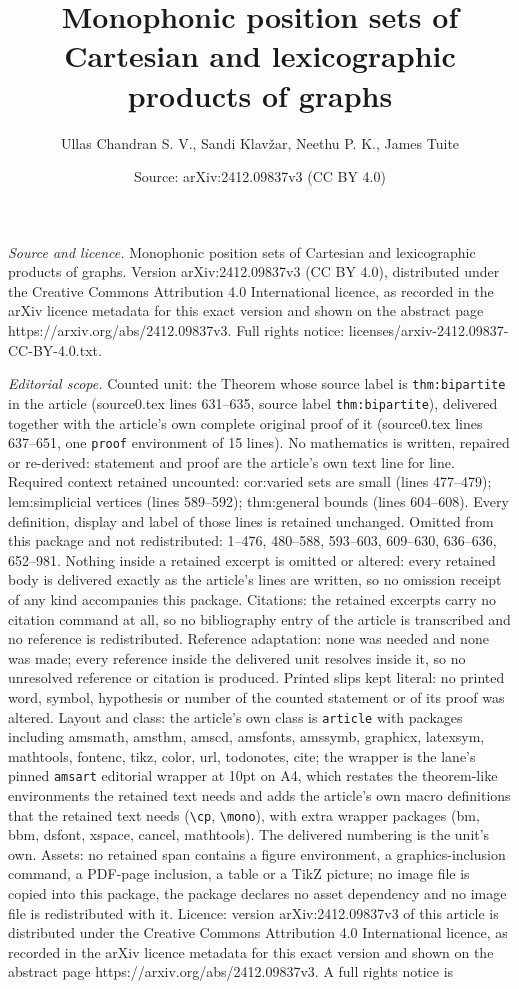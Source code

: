 \documentclass[10pt,a4paper]{amsart}
\title[Monophonic position sets of Cartesian and lexicographic prod]{Monophonic position sets of Cartesian and lexicographic products of graphs}
\author{Ullas Chandran S. V., Sandi Klav\v{z}ar, Neethu P. K., James Tuite}
\date{Source: arXiv:2412.09837v3 (CC BY 4.0)}
\begin{document}
\maketitle

\noindent\emph{Source and licence.} Monophonic position sets of Cartesian and lexicographic products of graphs. Version arXiv:2412.09837v3 (CC BY 4.0), distributed under the Creative Commons Attribution 4.0 International licence, as recorded in the arXiv licence metadata for this exact version and shown on the abstract page https://arxiv.org/abs/2412.09837v3. Full rights notice: licenses/arxiv-2412.09837-CC-BY-4.0.txt.\par\smallskip

\noindent\textit{Editorial scope.} Counted unit: the Theorem whose source label is \texttt{thm:bipartite} in the article (source0.tex lines 631--635, source label \texttt{thm:bipartite}), delivered together with the article's own complete original proof of it (source0.tex lines 637--651, one \texttt{proof} environment of 15 lines). No mathematics is written, repaired or re-derived: statement and proof are the article's own text line for line. Required context retained uncounted: cor:varied sets are small (lines 477--479); lem:simplicial vertices (lines 589--592); thm:general bounds (lines 604--608). Every definition, display and label of those lines is retained unchanged. Omitted from this package and not redistributed: 1--476, 480--588, 593--603, 609--630, 636--636, 652--981. Nothing inside a retained excerpt is omitted or altered: every retained body is delivered exactly as the article's lines are written, so no omission receipt of any kind accompanies this package. Citations: the retained excerpts carry no citation command at all, so no bibliography entry of the article is transcribed and no reference is redistributed. Reference adaptation: none was needed and none was made; every reference inside the delivered unit resolves inside it, so no unresolved reference or citation is produced. Printed slips kept literal: no printed word, symbol, hypothesis or number of the counted statement or of its proof was altered. Layout and class: the article's own class is \texttt{article} with packages including amsmath, amsthm, amscd, amsfonts, amssymb, graphicx, latexsym, mathtools, fontenc, tikz, color, url, todonotes, cite; the wrapper is the lane's pinned \texttt{amsart} editorial wrapper at 10pt on A4, which restates the theorem-like environments the retained text needs and adds the article's own macro definitions that the retained text needs (\texttt{\textbackslash cp}, \texttt{\textbackslash mono}), with extra wrapper packages (bm, bbm, dsfont, xspace, cancel, mathtools). The delivered numbering is the unit's own. Assets: no retained span contains a figure environment, a graphics-inclusion command, a PDF-page inclusion, a table or a TikZ picture; no image file is copied into this package, the package declares no asset dependency and no image file is redistributed with it. Licence: version arXiv:2412.09837v3 of this article is distributed under the Creative Commons Attribution 4.0 International licence, as recorded in the arXiv licence metadata for this exact version and shown on the abstract page https://arxiv.org/abs/2412.09837v3. A full rights notice is 
\end{document}
